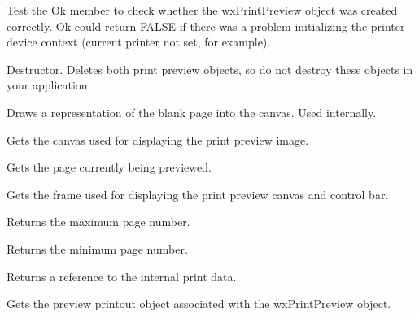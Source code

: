 Test the Ok member to check whether the wxPrintPreview object was created correctly.
Ok could return FALSE if there was a problem initializing the printer device context
(current printer not set, for example).



Destructor. Deletes both print preview objects, so do not destroy these objects
in your application.



Draws a representation of the blank page into the canvas. Used
internally.



Gets the canvas used for displaying the print preview image.



Gets the page currently being previewed.



Gets the frame used for displaying the print preview canvas
and control bar.



Returns the maximum page number.



Returns the minimum page number.



Returns a reference to the internal print data.



Gets the preview printout object associated with the wxPrintPreview object.

